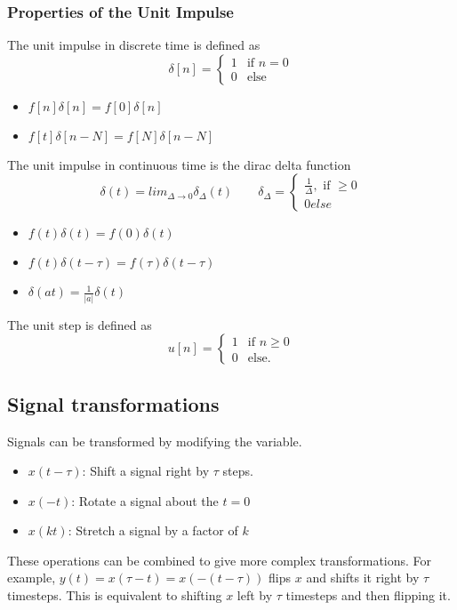 \subsubsection{Properties of the Unit Impulse}
\begin{definition}
    The unit impulse in discrete time is defined as 
    \[
	  \delta[n] = \begin{cases}
		1 & \text{if } n = 0\\
		0 & \text{else }
	  \end{cases}
    \]
\end{definition}
\begin{itemize}
    \item $f[n]\delta[n] = f[0]\delta[n]$
    \item $f[t]\delta[n-N] = f[N]\delta[n-N]$
\end{itemize}
\begin{definition}
    The unit impulse in continuous time is the dirac delta function
    \[
	  \delta(t)=lim_{\Delta\rightarrow 0}\delta_{\Delta}(t) \qquad
	  \delta_{\Delta}=\begin{cases}
		  \frac{1}{\Delta},\text{ if }\ge 0 \\
		  0 else
		\end{cases}
    \]
\end{definition}
\begin{itemize}
    \item $f(t)\delta(t) = f(0)\delta(t)$
    \item $f(t)\delta(t-\tau) = f(\tau)\delta(t-\tau)$
    \item $\delta(at) = \frac{1}{|a|}\delta(t)$
\end{itemize}
\begin{definition}
    The unit step is defined as 
    \[
		u[n] = \begin{cases}
		  1 & \text{if } n \geq 0\\
		  0 & \text{else.}
	  \end{cases}
	\]
\end{definition}
\subsection{Signal transformations}
Signals can be transformed by modifying the variable.
\begin{itemize}
    \item $x(t - \tau)$: Shift a signal right by $\tau$ steps.
    \item $x(-t)$: Rotate a signal about the $t=0$
    \item $x(kt)$: Stretch a signal by a factor of $k$
\end{itemize}
These operations can be combined to give more complex transformations.
For example, $y(t) = x(\tau - t) = x(-(t-\tau))$ flips $x$ and shifts it right by $\tau$ timesteps.
This is equivalent to shifting $x$ left by $\tau$ timesteps and then flipping it.
